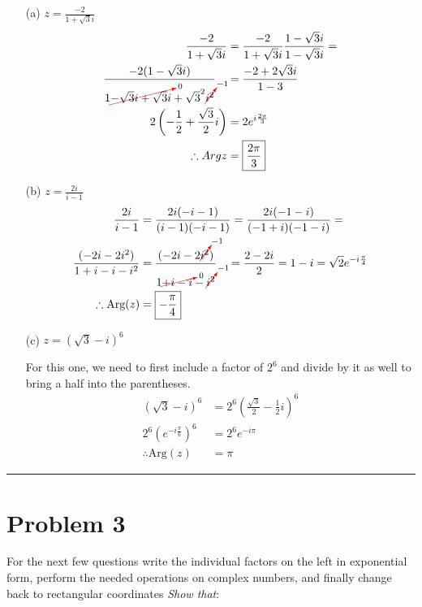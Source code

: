 \documentclass{article}
\newcommand{\canceling}[2]{\textcolor{red}{\cancelto{\textcolor{black}{#1}}{\textcolor{black}{#2}}}}
\begin{document}
\begin{enumerate}
    \item[(a)] $z=\frac{-2}{1+\sqrt{3}i}$ 
      \begin{align*}
        \frac{-2}{1+\sqrt{3}i} & = \frac{-2}{1+\sqrt{3}i} \frac{1-\sqrt{3}i}{1-\sqrt{3}i} =\\
        \frac{-2(1-\sqrt{3}i)}{1\canceling{0}{-\sqrt{3}i + \sqrt{3}i }+ \sqrt{3}^2\canceling{-1}{i^2}}\ \ \  &=  \frac{-2+2\sqrt{3}i}{1-3}\\
        2\left(-\frac{1}{2} + \frac{\sqrt{3}}{2}i\right) &= 2e^{i\frac{2\pi}{3}}\\
        \therefore Arg{z} &= \boxed{\frac{2\pi}{3}}
      \end{align*}
    \item[(b)] $z=\frac{2i}{i-1}$ 
      \begin{align*}
        \frac{2i}{i-1} &= \frac{2i(-i-1)}{(i-1)(-i-1)} = \frac{2i(-1-i)}{(-1 + i)(-1-i)} = \\
        \frac{(-2i-2i^2)}{1+i-i-i^2} &= \frac{(-2i-2\canceling{-1}{i^2})}{1\canceling{0}{+i-i}-\canceling{-1}{i^2}} \ \ \ = \frac{2-2i}{2} = 1-i = \sqrt{2}e^{-i\frac{\pi}{4}}\\
        \therefore \text{Arg}(z) &= \boxed{-\frac{\pi}{4}}  
      \end{align*}
    \item[(c)] $z=(\sqrt{3}-i)^{6}$
      
      For this one, we need to first include a factor of $2^6$ and divide by it as well to bring a half into the parentheses.
      \begin{align*}
        (\sqrt{3}-i)^{6} &= 2^6\left(\frac{\sqrt{3}}{2}-\frac{1}{2}i\right)^{6} \\
        2^6\left(e^{-i\frac{\pi}{6}}\right)^6 &= 2^6e^{-i\pi} \\
        \therefore \text{Arg}(z) &= \boxed{\pi} 
      \end{align*}
    \end{enumerate}

\hrule
\newpage
\section*{Problem 3}
For the next few questions write the individual factors on the left in exponential form, perform the needed operations on complex numbers, and finally change back to rectangular coordinates \textit{Show that}: 
\end{document}
